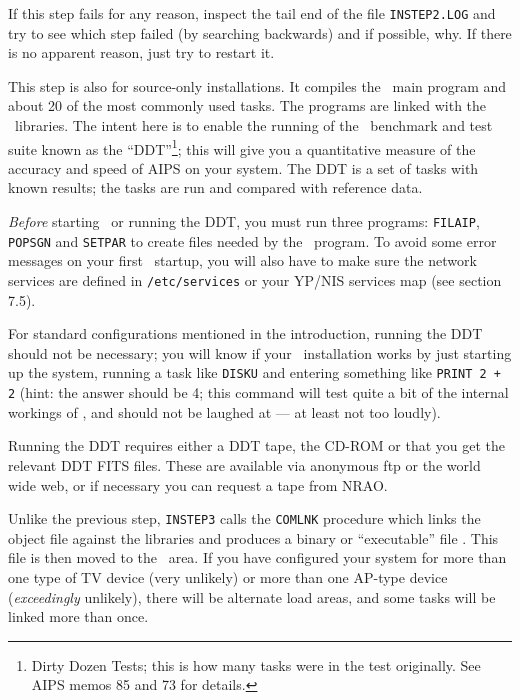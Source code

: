 \noindent If this step fails for any reason, inspect the tail end of
the file {\tt INSTEP2.LOG} and try to see which step failed (by
searching backwards) and if possible, why.  If there is no apparent
reason, just try to restart it.

\medskip{}

This step is also for source-only installations.  It compiles the
\ttaips\ main program and about 20 of the most commonly used tasks.  The
programs are linked with the \AIPS\ libraries.  The intent here is to
enable the running of the \aips\ benchmark and test suite known as the
``DDT''\footnote*{\eightpoint Dirty Dozen Tests; this is how many tasks
                              were in the test originally.  See AIPS
                              memos 85 and 73 for details.};
this will give you a quantitative measure of the accuracy and speed of
AIPS on your system.  The DDT is a set of tasks with known results; the
tasks are run and compared with reference data.

{\it Before\/} starting \ttaips\ or running the DDT, you must run three
programs: {\tt FILAIP}, {\tt POPSGN} and {\tt SETPAR} to create files
needed by the \ttaips\ program.  To avoid some error messages on your
first \ttaips\ startup, you will also have to make sure the network
services are defined in {\tt /etc/services} or your YP/NIS services map
(see section 7.5).

For standard configurations mentioned in the introduction, running the
DDT  should not be necessary; you will know if your \AIPS\ installation
works by just starting up the system, running a task like {\tt DISKU}
and entering something like {\tt PRINT 2 + 2} (hint: the answer should
be 4; this command will test quite a bit of the internal workings of
\ttaips, and should not be laughed at --- at least not too loudly).

Running the DDT requires either a DDT tape, the CD-ROM or that you get
the relevant DDT FITS files.  These are available via anonymous ftp or
the world wide web, or if necessary you can request a tape from NRAO.

Unlike the previous step, {\tt INSTEP3} calls the {\tt COMLNK} procedure
which links the object file against the libraries and produces a binary
or ``executable'' file .  This file is then moved to the \LOAD\ area.
If you have configured your system for more than one type of TV device
(very unlikely) or more than one AP-type device ({\it exceedingly\/}
unlikely), there will be alternate load areas, and some tasks will be
linked more than once.

